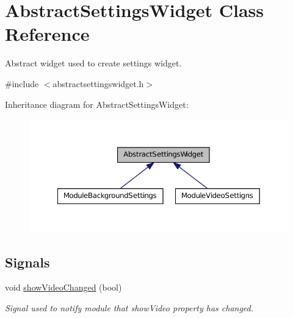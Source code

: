 \hypertarget{class_abstract_settings_widget}{
\section{AbstractSettingsWidget Class Reference}
\label{db/dcb/class_abstract_settings_widget}
}


Abstract widget used to create settings widget.  




{\ttfamily \#include $<$abstractsettingswidget.h$>$}



Inheritance diagram for AbstractSettingsWidget:
\nopagebreak
\begin{figure}[H]
\begin{center}
\leavevmode
\includegraphics[width=364pt]{db/de4/class_abstract_settings_widget__inherit__graph}
\end{center}
\end{figure}
\subsection*{Signals}
\begin{DoxyCompactItemize}
\item 
void \hyperlink{class_abstract_settings_widget_a1f1f041ffe91ad92284eda558f011a39}{showVideoChanged} (bool)
\begin{DoxyCompactList}\small\item\em Signal used to notify module that showVideo property has changed. \item\end{DoxyCompactList}\end{DoxyCompactItemize}
